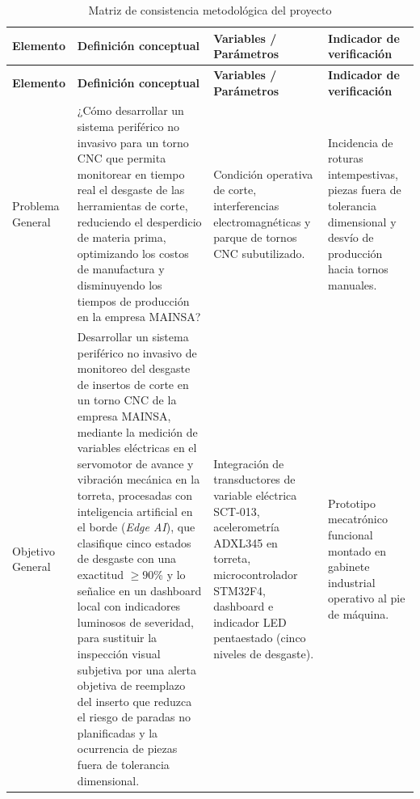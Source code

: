 {\footnotesize
{}
\setlength{\parskip}{1.5pt}
\setlength{\tabcolsep}{3.5pt}
\begin{longtable}{>{\raggedright\arraybackslash}p{2.1cm}>{\raggedright\arraybackslash}p{3.8cm}>{\raggedright\arraybackslash}p{3.8cm}>{\raggedright\arraybackslash}p{3.8cm}}
\caption{Matriz de consistencia metodológica del proyecto}
\label{tab:matriz_consistencia}
\\
\hline
\textbf{Elemento} & \textbf{Definición conceptual} & \textbf{Variables / Parámetros} & \textbf{Indicador de verificación} \\
\hline \hline
\endfirsthead

\hline
\textbf{Elemento} & \textbf{Definición conceptual} & \textbf{Variables / Parámetros} & \textbf{Indicador de verificación} \\
\hline \hline
\endhead

\hline
\endfoot

\hline
\multicolumn{4}{c}{\textbf{Fuente:} Elaboración propia}
\endlastfoot

Problema General & 
¿Cómo desarrollar un sistema periférico no invasivo para un torno CNC que permita monitorear en tiempo real el desgaste de las herramientas de corte, reduciendo el desperdicio de materia prima, optimizando los costos de manufactura y disminuyendo los tiempos de producción en la empresa MAINSA? & 
Condición operativa de corte, interferencias electromagnéticas y parque de tornos CNC subutilizado. & 
Incidencia de roturas intempestivas, piezas fuera de tolerancia dimensional y desvío de producción hacia tornos manuales.\\ \hline

Objetivo General & 
Desarrollar un sistema periférico no invasivo de monitoreo del desgaste de insertos de corte en un torno CNC de la empresa MAINSA, mediante la medición de variables eléctricas en el servomotor de avance y vibración mecánica en la torreta, procesadas con inteligencia artificial en el borde (\textit{Edge AI}), que clasifique cinco estados de desgaste con una exactitud $\ge 90$\% y lo señalice en un dashboard local con indicadores luminosos de severidad, para sustituir la inspección visual subjetiva por una alerta objetiva de reemplazo del inserto que reduzca el riesgo de paradas no planificadas y la ocurrencia de piezas fuera de tolerancia dimensional. & 
Integración de transductores de variable eléctrica SCT-013, acelerometría ADXL345 en torreta, microcontrolador STM32F4, dashboard e indicador LED pentaestado (cinco niveles de desgaste). & 
Prototipo mecatrónico funcional montado en gabinete industrial operativo al pie de máquina.\\ \hline


\end{longtable}}
